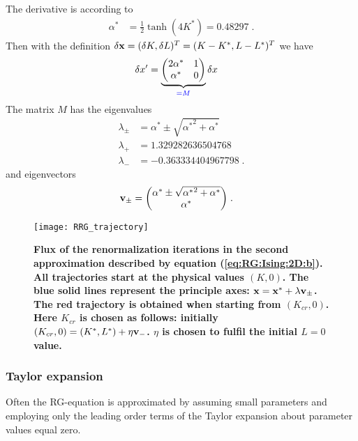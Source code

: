 %
The derivative is according to 
%
\begin{align*}
\alpha^{*} &=  \frac{1}{2} \tanh(4 K^{*})
= 0.48297\;.
\end{align*}
%
Then with the definition  $\var \mathbf x = (\var K,\var L)^{T} = (K-K^{*},L-L^{*})^{T}$
we have
%
\begin{align*}
\var x'
&= 
\underbrace{
\mqty(2 \alpha^{*} & 1\\
\alpha^{*}&0
)
}_{\color{blue} = M}
\var x
\end{align*}
%
The matrix $M$ has the eigenvalues
%
\begin{align*}
\lambda_{\pm} &= \alpha^{*} \pm \sqrt{{\alpha^{*}}^{2} +\alpha^{*}}\\
\lambda_{+} &= 1.329282636504768\\
\lambda_{-} &= -0.363334404967798\;.
\end{align*}
%
and eigenvectors
%
\begin{align*}
\vv v_{\pm} &= 
\mqty(
\alpha^{*} \pm  \sqrt{{\alpha^{*}}^{2}+\alpha^{*}}\\\alpha^{*}
)\;.
\end{align*}
%

%
\begin{figure}[htbp]
\begin{center}
\texttt{[image: RRG\_trajectory]}
\caption{\bf Flux of the renormalization iterations in the second approximation
described by equation (\ref{eq:RG:Ising:2D:b}). 
All trajectories start at the physical values  $(K,0)$.
The blue solid lines represent the 
principle axes: $\mathbf x = \mathbf x^{*} + \lambda \mathbf v_{\pm}$. The red trajectory is obtained
when starting from $(K_{cr},0)$. Here $K_{cr}$ is chosen as follows: initially  $(K_{cr},0)
=(K^{*},L^{*}) + \eta \mathbf v_{-}$.   $\eta$ is chosen to fulfil the initial $L=0$ value.
}
\label{fig:rng:ising:2d:b}
\end{center}
\end{figure}

\subsubsection{Taylor expansion}

Often the RG-equation is approximated by assuming small parameters and employing only the 
leading order terms of the Taylor expansion about parameter values equal zero.

